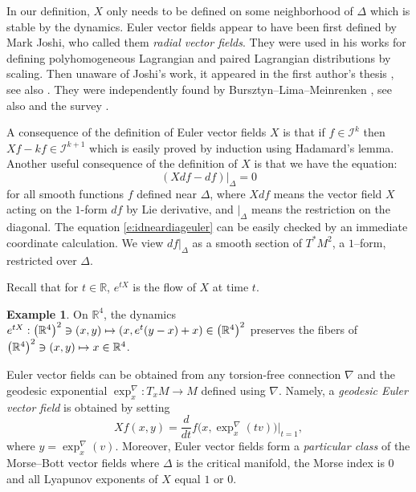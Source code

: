 \documentclass[JEP,XML,SOM,Unicode]{cedram}
\let\pazocal\mathscr
\def\mto{\mathchoice{\longmapsto}{\mapsto}{\mapsto}{\mapsto}}
\theoremstyle{definition}
\newtheorem{example}[theorem]{Example}
\newcommand\rr{{\mathbb R}}
\let\euler X
\begin{document}
In our definition, $\euler$ only needs to be defined on some neighborhood of $\Delta$ which is stable by the dynamics.
Euler vector fields appear to have been first defined by Mark Joshi, who called them \emph{radial vector fields}. They were used in his works \cite{10.2307/2162103,Joshi1998} for defining polyhomogeneous Lagrangian and paired Lagrangian distributions by scaling. Then unaware of Joshi's work, it appeared in the first author's thesis \cite{dangthesis}, see also \cite[Def.\,1.1]{DangAHP}. They were independently found by Bursztyn--Lima--Meinrenken \cite{Bursztyn2019}, see also \cite{Bischo2020} and the survey \cite{Meinrenken2021}.

A consequence of the definition of Euler vector fields $\euler$ is that
if $f\in \pazocal{I}^k$ then $\euler f-kf\in \pazocal{I}^{k+1}$ which is
easily proved by induction using Hadamard's lemma.
Another useful consequence of the definition of $\euler$ is that
we have the equation:
\begin{equation}\label{e:idneardiageuler}
\left(Xdf-df\right)|_{\Delta}=0
\end{equation}
for all smooth functions $f$ defined near $\Delta$, where $\euler df$ means the vector field $\euler$ acting on the $1$-form $df$ by Lie derivative, and $|_\Delta$ means the restriction on the diagonal.
The equation \eqref{e:idneardiageuler} can be easily checked by an immediate coordinate calculation.
We view $df|_\Delta$ as a smooth section of $T^*M^2$, a $1$--form, restricted over $\Delta$.

Recall that for $t\in \rr$, $e^{t\euler}$ is the flow of $\euler$ at time $t$.

\begin{example}
On $\mathbb{R}^4$, the dynamics $ e^{t\euler}: \left(\mathbb{R}^4\right)^2\ni(x,y) \mto (x,e^{t}(y-x)+x)\in \left(\mathbb{R}^4\right)^2 $ preserves
the fibers of $\left(\mathbb{R}^4\right)^2 \ni (x,y)\mto x\in \mathbb{R}^4$.
\end{example}

Euler vector fields can be obtained from any torsion-free connection $\nabla$ and the geodesic exponential $\exp_x^\nabla:T_xM\to M$ defined using $\nabla$.
Namely, a \emph{geodesic Euler vector field} is obtained by setting
\[
\euler f(x,y)=\frac{d}{dt}f\big(x,\exp^\nabla_x(tv)\big)|_{t=1},
\]
where $y=\exp_x^\nabla(v)$. Moreover, Euler vector fields form a \emph{particular class} of the Morse--Bott vector fields
where $\Delta$ is the critical manifold, the Morse index is $0$ and all Lyapunov exponents of $\euler$ equal $1$ or $0$.
\end{document}
